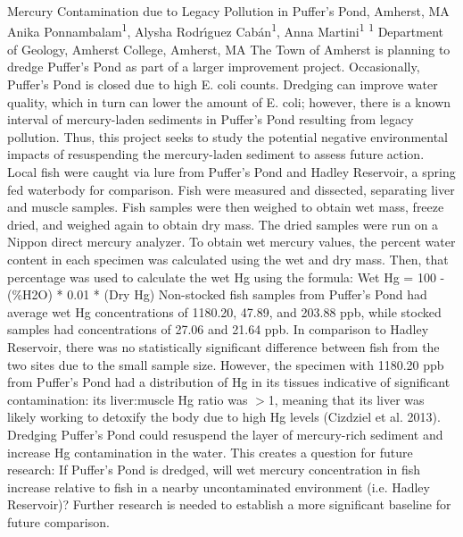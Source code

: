 \makeabstract
    {
    Mercury Contamination due to Legacy Pollution in Puffer{\textquoteright}s Pond, Amherst, MA
    }
    {
    Anika Ponnambalam\textsuperscript{1}, Alysha Rodr{\'\i}guez Cab\'an\textsuperscript{1}, Anna Martini\textsuperscript{1}
    }
    {
    \textsuperscript{1} Department of Geology, Amherst College, Amherst, MA
    }
    {
    The Town of Amherst is planning to dredge Puffer{\textquoteright}s Pond as part of a larger improvement project. Occasionally, Puffer{\textquoteright}s Pond is closed due to high E. coli counts. Dredging can improve water quality, which in turn can lower the amount of E. coli; however, there is a known interval of mercury-laden sediments in Puffer{\textquoteright}s Pond resulting from legacy pollution. Thus, this project seeks to study the potential negative environmental impacts of resuspending the mercury-laden sediment to assess future action.
    }
    {
    Local fish were caught via lure from Puffer{\textquoteright}s Pond and Hadley Reservoir, a spring fed waterbody for comparison. Fish were measured and dissected, separating liver and muscle samples. Fish samples were then weighed to obtain wet mass, freeze dried, and weighed again to obtain dry mass. The dried samples were run on a Nippon direct mercury analyzer. To obtain wet mercury values, the percent water content in each specimen was calculated using the wet and dry mass. Then, that percentage was used to calculate the wet Hg using the formula: Wet Hg = 100 - (\%H2O) * 0.01 * (Dry Hg)
    }
    {
    Non-stocked fish samples from Puffer{\textquoteright}s Pond had average wet Hg concentrations of 1180.20, 47.89, and 203.88 ppb, while stocked samples had concentrations of 27.06 and 21.64 ppb. In comparison to Hadley Reservoir, there was no statistically significant difference between fish from the two sites due to the small sample size. However, the specimen with 1180.20 ppb from Puffer{\textquoteright}s Pond had a distribution of Hg in its tissues indicative of significant contamination: its liver:muscle Hg ratio was \ensuremath{>}1, meaning that its liver was likely working to detoxify the body due to high Hg levels (Cizdziel et al. 2013).
    }
    {
    Dredging Puffer{\textquoteright}s Pond could resuspend the layer of mercury-rich sediment and increase Hg contamination in the water. This creates a question for future research: If Puffer{\textquoteright}s Pond is dredged, will wet mercury concentration in fish increase relative to fish in a nearby uncontaminated environment (i.e. Hadley Reservoir)? Further research is needed to establish a more significant baseline for future comparison.
    }

    \newpage
    